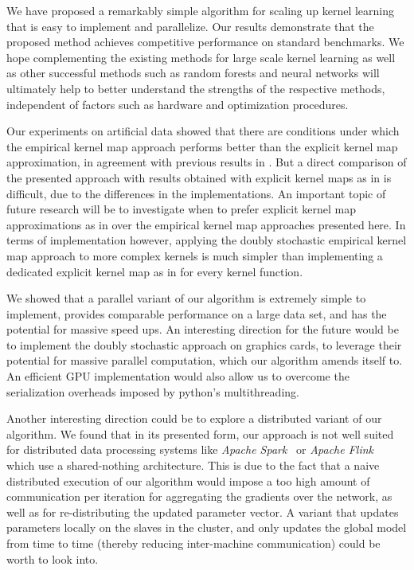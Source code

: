 \documentclass{article} %
\begin{document}
We have proposed a remarkably simple algorithm for scaling up kernel learning that is easy to implement and parallelize. Our results demonstrate that the proposed method achieves competitive performance on standard benchmarks. We hope complementing the existing methods for large scale kernel learning as well as other successful methods such as random forests and neural networks will ultimately help to better understand the strengths of the respective methods, independent of factors such as hardware and optimization procedures. 

Our experiments on artificial data showed that there are conditions under which the empirical kernel map approach performs better than the explicit kernel map approximation, in agreement with previous results in \cite{Vedaldi2010}. But a direct comparison of the presented approach with results obtained with explicit kernel maps as in \cite{Dai2014} is difficult, due to the differences in the implementations. An important topic of future research will be to investigate when to prefer explicit kernel map approximations as in \cite{Rahimi2008, Dai2014} over the empirical kernel map approaches presented here. In terms of implementation however, applying the doubly stochastic empirical kernel map approach to more complex kernels is much simpler than implementing a dedicated explicit kernel map as in \cite{Dai2014} for every kernel function. 

We showed that a parallel variant of our algorithm is extremely simple to implement, provides comparable performance on a large data set, and has the potential for massive speed ups. An interesting direction for the future would be to implement the doubly stochastic approach on graphics cards, to leverage their potential for massive parallel computation, which our algorithm amends itself to. An efficient GPU implementation would also allow us to overcome the serialization overheads imposed by python's multithreading.

Another interesting direction could be to explore a distributed variant of our algorithm. We found that in its presented form, our approach is not well suited for distributed data processing systems like \textit{Apache Spark}~\cite{Zaharia2012} or \textit{Apache Flink}~\cite{Alexandrov2014} which use a shared-nothing architecture. This is due to the fact that a naive distributed execution of our algorithm would impose a too high amount of communication per iteration for aggregating the gradients over the network, as well as for re-distributing the updated parameter vector. A variant that updates parameters locally on the slaves in the cluster, and only updates the global model from time to time (thereby reducing inter-machine communication) could be worth to look into. 

\newpage

{\small
  
  }
\end{document}
